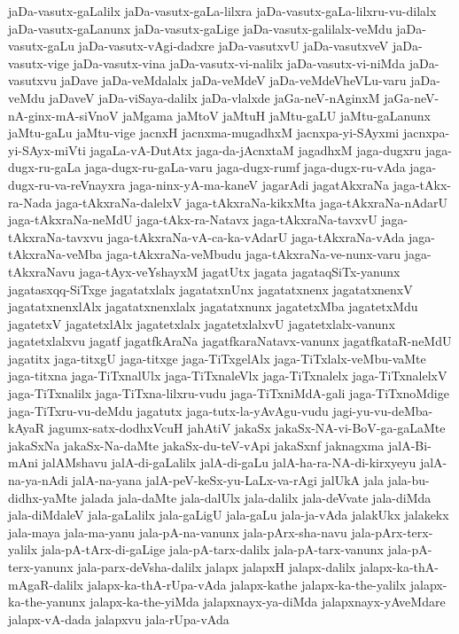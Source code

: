 {jaDa-vasutx-gaLalilx
jaDa-vasutx-gaLa-lilxra
jaDa-vasutx-gaLa-lilxru-vu-dilalx
jaDa-vasutx-gaLanunx
jaDa-vasutx-gaLige
jaDa-vasutx-galilalx-veMdu
jaDa-vasutx-gaLu
jaDa-vasutx-vAgi-dadxre
jaDa-vasutxvU
jaDa-vasutxveV
jaDa-vasutx-vige
jaDa-vasutx-vina
jaDa-vasutx-vi-nalilx
jaDa-vasutx-vi-niMda
jaDa-vasutxvu
jaDave
jaDa-veMdalalx
jaDa-veMdeV
jaDa-veMdeVheVLu-varu
jaDa-veMdu
jaDaveV
jaDa-viSaya-dalilx
jaDa-vlalxde
jaGa-neV-nAginxM
jaGa-neV-nA-ginx-mA-siVnoV
jaMgama
jaMtoV
jaMtuH
jaMtu-gaLU
jaMtu-gaLanunx
jaMtu-gaLu
jaMtu-vige
jacnxH
jacnxma-mugadhxM
jacnxpa-yi-SAyxmi
jacnxpa-yi-SAyx-miVti
jagaLa-vA-DutAtx
jaga-da-jAcnxtaM
jagadhxM
jaga-dugxru
jaga-dugx-ru-gaLa
jaga-dugx-ru-gaLa-varu
jaga-dugx-rumf
jaga-dugx-ru-vAda
jaga-dugx-ru-va-reVnayxra
jaga-ninx-yA-ma-kaneV
jagarAdi
jagatAkxraNa
jaga-tAkx-ra-Nada
jaga-tAkxraNa-dalelxV
jaga-tAkxraNa-kikxMta
jaga-tAkxraNa-nAdarU
jaga-tAkxraNa-neMdU
jaga-tAkx-ra-Natavx
jaga-tAkxraNa-tavxvU
jaga-tAkxraNa-tavxvu
jaga-tAkxraNa-vA-ca-ka-vAdarU
jaga-tAkxraNa-vAda
jaga-tAkxraNa-veMba
jaga-tAkxraNa-veMbudu
jaga-tAkxraNa-ve-nunx-varu
jaga-tAkxraNavu
jaga-tAyx-veYshayxM
jagatUtx
jagata
jagataqSiTx-yanunx
jagatasxqq-SiTxge
jagatatxlalx
jagatatxnUnx
jagatatxnenx
jagatatxnenxV
jagatatxnenxlAlx
jagatatxnenxlalx
jagatatxnunx
jagatetxMba
jagatetxMdu
jagatetxV
jagatetxlAlx
jagatetxlalx
jagatetxlalxvU
jagatetxlalx-vanunx
jagatetxlalxvu
jagatf
jagatfkAraNa
jagatfkaraNatavx-vanunx
jagatfkataR-neMdU
jagatitx
jaga-titxgU
jaga-titxge
jaga-TiTxgelAlx
jaga-TiTxlalx-veMbu-vaMte
jaga-titxna
jaga-TiTxnalUlx
jaga-TiTxnaleVlx
jaga-TiTxnalelx
jaga-TiTxnalelxV
jaga-TiTxnalilx
jaga-TiTxna-lilxru-vudu
jaga-TiTxniMdA-gali
jaga-TiTxnoMdige
jaga-TiTxru-vu-deMdu
jagatutx
jaga-tutx-la-yAvAgu-vudu
jagi-yu-vu-deMba-kAyaR
jagumx-satx-dodhxVcuH
jahAtiV
jakaSx
jakaSx-NA-vi-BoV-ga-gaLaMte
jakaSxNa
jakaSx-Na-daMte
jakaSx-du-teV-vApi
jakaSxnf
jaknagxma
jalA-Bi-mAni
jalAMshavu
jalA-di-gaLalilx
jalA-di-gaLu
jalA-ha-ra-NA-di-kirxyeyu
jalA-na-ya-nAdi
jalA-na-yana
jalA-peV-keSx-yu-LaLx-va-rAgi
jalUkA
jala
jala-bu-didhx-yaMte
jalada
jala-daMte
jala-dalUlx
jala-dalilx
jala-deVvate
jala-diMda
jala-diMdaleV
jala-gaLalilx
jala-gaLigU
jala-gaLu
jala-ja-vAda
jalakUkx
jalakekx
jala-maya
jala-ma-yanu
jala-pA-na-vanunx
jala-pArx-sha-navu
jala-pArx-terx-yalilx
jala-pA-tArx-di-gaLige
jala-pA-tarx-dalilx
jala-pA-tarx-vanunx
jala-pA-terx-yanunx
jala-parx-deVsha-dalilx
jalapx
jalapxH
jalapx-dalilx
jalapx-ka-thA-mAgaR-dalilx
jalapx-ka-thA-rUpa-vAda
jalapx-kathe
jalapx-ka-the-yalilx
jalapx-ka-the-yanunx
jalapx-ka-the-yiMda
jalapxnayx-ya-diMda
jalapxnayx-yAveMdare
jalapx-vA-dada
jalapxvu
jala-rUpa-vAda
}
